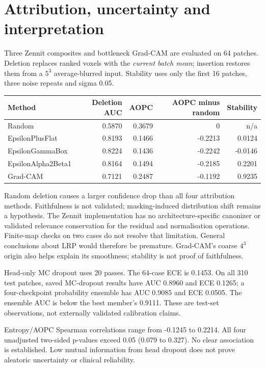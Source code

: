 \documentclass[11pt,a4paper]{article}
\begin{document}
\newpage
\section*{Attribution, uncertainty and interpretation}
Three Zennit composites and bottleneck Grad-CAM are evaluated on 64 patches. Deletion replaces ranked voxels with the \emph{current batch mean}; insertion restores them from a $5^3$ average-blurred input. Stability uses only the first 16 patches, three noise repeats and sigma 0.05.

\begin{center}\small
\begin{tabular}{lrrrr}\toprule
Method & Deletion AUC & AOPC & AOPC minus random & Stability\\\midrule
Random & 0.5870 & 0.3679 & 0 & n/a\\
EpsilonPlusFlat & 0.8193 & 0.1466 & -0.2213 & 0.0124\\
EpsilonGammaBox & 0.8224 & 0.1436 & -0.2242 & -0.0146\\
EpsilonAlpha2Beta1 & 0.8164 & 0.1494 & -0.2185 & 0.2201\\
Grad-CAM & 0.7121 & 0.2487 & -0.1192 & 0.9235\\\bottomrule
\end{tabular}\end{center}
Random deletion causes a larger confidence drop than all four attribution methods. Faithfulness is not validated; masking-induced distribution shift remains a hypothesis. The Zennit implementation has no architecture-specific canonizer or validated relevance conservation for the residual and normalisation operations. Finite-map checks on two cases do not resolve that limitation. General conclusions about LRP would therefore be premature. Grad-CAM's coarse $4^3$ origin also helps explain its smoothness; stability is not proof of faithfulness.

Head-only MC dropout uses 20 passes. The 64-case ECE is 0.1453. On all 310 test patches, saved MC-dropout results have AUC 0.8960 and ECE 0.1265; a four-checkpoint probability ensemble has AUC 0.9085 and ECE 0.0505. The ensemble AUC is below the best member's 0.9111. These are test-set observations, not externally validated calibration claims.

Entropy/AOPC Spearman correlations range from -0.1245 to 0.2214. All four unadjusted two-sided p-values exceed 0.05 (0.079 to 0.327). No clear association is established. Low mutual information from head dropout does not prove aleatoric uncertainty or clinical reliability.
\end{document}
